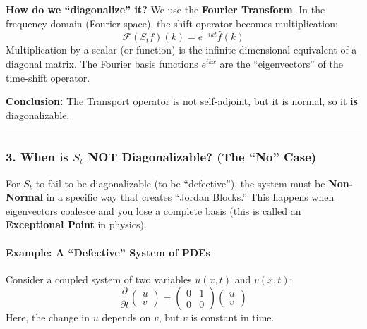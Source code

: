 \documentclass[oneside]{book}
\begin{document}
\textbf{How do we ``diagonalize'' it?}
We use the \textbf{Fourier Transform}. In the frequency domain (Fourier space), the shift operator becomes multiplication:
\[ \mathcal{F}(S_t f)(k) = e^{-ikt} \hat{f}(k) \]
Multiplication by a scalar (or function) is the infinite-dimensional equivalent of a diagonal matrix. The Fourier basis functions $e^{ikx}$ are the ``eigenvectors'' of the time-shift operator.

\textbf{Conclusion:} The Transport operator is not self-adjoint, but it is normal, so it \textbf{is} diagonalizable.

\noindent\rule{\textwidth}{0.4pt}

\subsubsection*{3. When is $S_t$ NOT Diagonalizable? (The ``No'' Case)}
For $S_t$ to fail to be diagonalizable (to be ``defective''), the system must be \textbf{Non-Normal} in a specific way that creates ``Jordan Blocks.'' This happens when eigenvectors coalesce and you lose a complete basis (this is called an \textbf{Exceptional Point} in physics).

\paragraph{Example: A ``Defective'' System of PDEs}
Consider a coupled system of two variables $u(x,t)$ and $v(x,t)$:
\[
\frac{\partial}{\partial t} \begin{pmatrix} u \\ v \end{pmatrix} = \begin{pmatrix} 0 & 1 \\ 0 & 0 \end{pmatrix} \begin{pmatrix} u \\ v \end{pmatrix}
\]
Here, the change in $u$ depends on $v$, but $v$ is constant in time.
\end{document}
